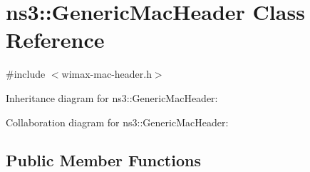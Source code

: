 \hypertarget{classns3_1_1GenericMacHeader}{}\section{ns3\+:\+:Generic\+Mac\+Header Class Reference}
\label{classns3_1_1GenericMacHeader}


{\ttfamily \#include $<$wimax-\/mac-\/header.\+h$>$}



Inheritance diagram for ns3\+:\+:Generic\+Mac\+Header\+:


Collaboration diagram for ns3\+:\+:Generic\+Mac\+Header\+:
\subsection*{Public Member Functions}
